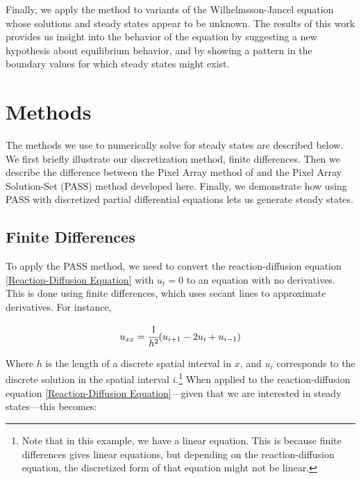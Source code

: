 \documentclass[11pt]{article}
\begin{document}
Finally, we apply the method to variants of the Wilhelmsson-Jancel equation whose solutions and steady states appear to be unknown. The results of this work provides us insight into the behavior of the equation by suggesting a new hypothesis about equilibrium behavior, and by showing a pattern in the boundary values for which steady states might exist.

\section{Methods}\label{sec:methods}

The methods we use to numerically solve for steady states are described below. We first briefly illustrate our discretization method, finite differences. Then we describe the difference between the Pixel Array method of \citep{Introduction_to_PA} and the Pixel Array Solution-Set (PASS) method developed here. Finally, we demonstrate how using PASS with discretized partial differential equations lets us generate steady states.

\subsection{Finite Differences}

\begin{comment}
Introduce set theoretic variant of pixel array method. Uses (blank) as addition, (blank) as multiplication, gives full solutions instead of merely indicating the presence of a solution. Use the homogeneous heat equation as an example.
\end{comment}

To apply the PASS method, we need to convert the reaction-diffusion equation \eqref{Reaction-Diffusion Equation} with $u_t = 0$ to an equation with no derivatives. This is done using finite differences, which uses secant lines to approximate derivatives. For instance,

\begin{equation}
    \label{FD second order}
    u_{xx} = \cfrac{1}{h^2} (u_{i+1} - 2u_i + u_{i-1})
\end{equation}

\noindent Where $h$ is the length of a discrete spatial interval in $x$, and $u_i$ corresponds to the discrete solution in the spatial interval $i$.\footnote{Note that in this example, we have a linear equation. This is because finite differences gives linear equations, but depending on the reaction-diffusion equation, the discretized form of that equation might not be linear.} When applied to the reaction-diffusion equation \eqref{Reaction-Diffusion Equation}---given that we are interested in steady states---this becomes:
\end{document}
